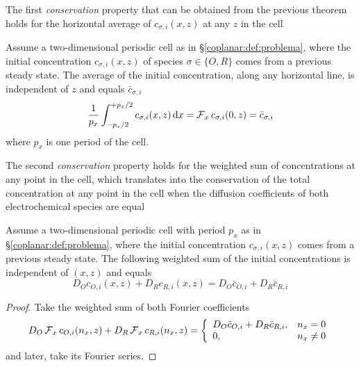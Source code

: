 The first \emph{conservation} property that can be obtained from the previous theorem
holds for the horizontal average of $c_{\sigma,i}(x,z)$ at any $z$ in the cell

\begin{corolario}
	\label{coplanar:cor:bar_ci}
	Assume a two-dimensional periodic cell as in \S\ref{coplanar:def:problema},
	where the initial concentration $c_{\sigma,i}(x,z)$ of species $\sigma \in \{O, R\}$
	comes from a previous steady state.
	The average of the initial concentration, along any horizontal line,
	is independent of $z$ and equals $\bar{c}_{\sigma,i}$
	\begin{equation}
		\label{coplanar:eqn:bar_ci}
		\frac{1}{p_{x}} \int_{-p_{x}/2}^{+p_{x}/2} c_{\sigma,i}(x,z) \,\mathrm{d}x =
		\operatorname{\mathcal{F}}_{x} c_{\sigma,i}(0,z) = \bar{c}_{\sigma,i}
	\end{equation}
	where $p_{x}$ is one period of the cell.
\end{corolario}

The second \emph{conservation} property holds for the weighted sum of concentrations at any point in the cell,
which translates into the conservation of the total concentration at any point in the cell
when the diffusion coefficients of both electrochemical species are equal

\begin{corolario}
	\label{coplanar:cor:ci:total}
	Assume a two-dimensional periodic cell with period $p_{x}$ as in \S\ref{coplanar:def:problema},
	where the initial concentration $c_{\sigma,i}(x,z)$ comes from a previous steady state. The following weighted sum of the initial concentrations is independent of $(x,z)$ and equals
	\begin{equation}
		\label{coplanar:eqn:ci_total}
		D_{O} c_{O,i}(x,z) + D_{R} c_{R,i}(x,z) =
		D_{O} \bar{c}_{O,i} + D_{R} \bar{c}_{R,i}
	\end{equation}
\end{corolario}

\begin{proof}
	Take the weighted sum of both Fourier coefficients
	\begin{equation}
		D_{O} \operatorname{\mathcal{F}}_{x} c_{O,i}(n_{x},z) + D_{R} \operatorname{\mathcal{F}}_{x} c_{R,i}(n_{x},z) =
		\left\{
			\begin{array}{ll}
				D_{O} \bar{c}_{O,i} + D_{R} \bar{c}_{R,i}, & n_{x} = 0 \\
				0, & n_{x} \neq 0
			\end{array}
		\right.
	\end{equation}
	and later, take its Fourier series.
\end{proof}



